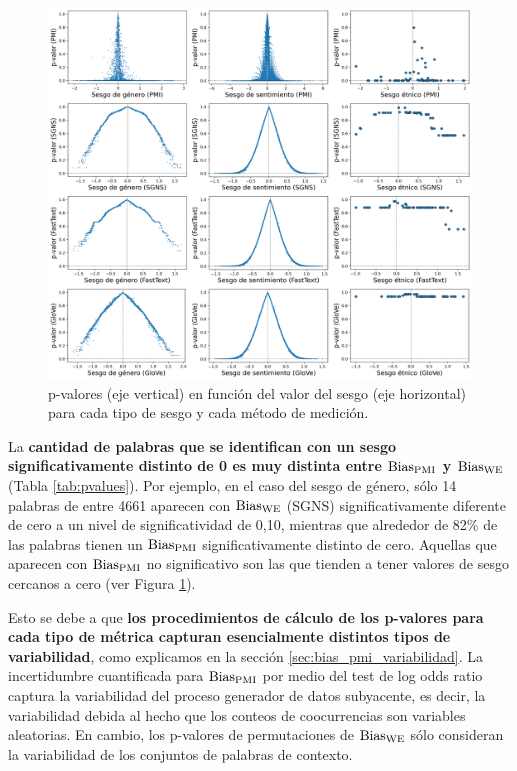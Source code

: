 

\begin{figure}[h]
    \centering
    \includegraphics[width=\textwidth]{img/grid_pvalues.png}
    \caption[p-valores en función del valor del sesgo para cada tipo de sesgo y cada método de medición]{
        p-valores (eje vertical) en función del valor del sesgo (eje horizontal) para cada tipo de sesgo y cada método de medición.
    }
    \label{fig:pvalues}
\end{figure}


La \textbf{cantidad de palabras que se identifican con un sesgo significativamente distinto de 0 es muy distinta entre $\operatorname{Bias_{PMI}}$ y $\operatorname{Bias_{WE}}$} (Tabla \ref{tab:pvalues}). Por ejemplo, en el caso del sesgo de género, sólo 14 palabras de entre 4661 aparecen con $\operatorname{Bias_{WE}}$ (SGNS) significativamente diferente de cero a un nivel de significatividad de 0,10, mientras que alrededor de 82\% de las palabras tienen un $\operatorname{Bias_{PMI}}$ significativamente distinto de cero. Aquellas que aparecen con $\operatorname{Bias_{PMI}}$ no significativo son las que tienden a tener valores de sesgo cercanos a cero (ver Figura \ref{fig:pvalues}).

Esto se debe a que \textbf{los procedimientos de cálculo de los p-valores para cada tipo de métrica capturan esencialmente distintos tipos de variabilidad}, como explicamos en la sección \ref{sec:bias_pmi_variabilidad}. La incertidumbre cuantificada para $\operatorname{Bias_{PMI}}$ por medio del test de log odds ratio captura la variabilidad del proceso generador de datos subyacente, es decir, la variabilidad debida al hecho que los conteos de coocurrencias son variables aleatorias. En cambio, los p-valores de permutaciones de $\operatorname{Bias_{WE}}$ sólo consideran la variabilidad de los conjuntos de palabras de contexto. 

